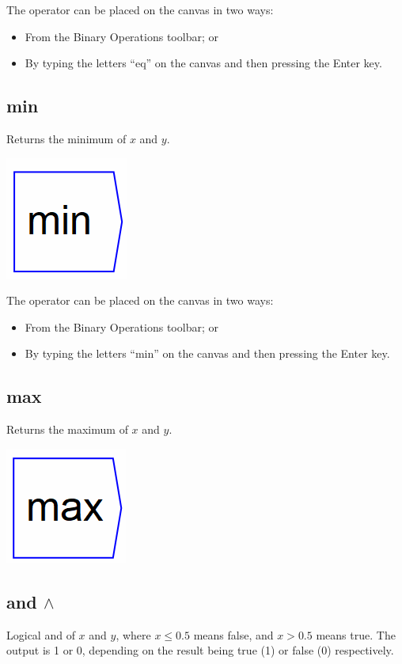 The operator can be placed on the canvas in two ways:

\begin{itemize}
\item From the Binary Operations toolbar; or
\item By typing the letters ``eq'' on the canvas and then pressing the
  Enter key.
\end{itemize}

\subsection{min}\label{Operation:min} Returns the minimum of $x$ and $y$.

\includegraphics{images/minkey.png} 

The operator can be placed on the canvas in two ways:

\begin{itemize}
\item From the Binary Operations toolbar; or
\item By typing the letters ``min'' on the canvas and then pressing
  the Enter key.
\end{itemize}

\subsection{max}\label{Operation:max} Returns the maximum of $x$ and $y$.

\includegraphics{images/maxkey.png} 

\subsection{and $\wedge$}\label{Operation:and_} Logical and of $x$ and $y$, where $x\le 0.5$ means false, and $x>0.5$ means true. The output is 1 or 0, depending on the result being true (1) or false (0) respectively.

